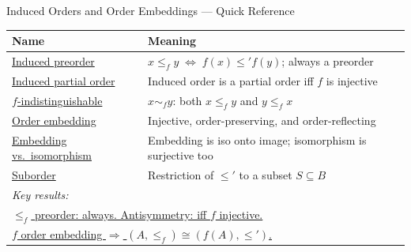 

\begin{toolkitbox}{Induced Orders and Order Embeddings --- Quick Reference}
\small
\begin{tabular}{l l}
\toprule
\textbf{Name}  & \textbf{Meaning} \\
\midrule
\hyperref[def:induced-order]{Induced preorder}     & $x \leq_f y \;\Leftrightarrow\; f(x) \leq' f(y)$; always a preorder  \\
\hyperref[prop:induced-poset]{Induced partial order}  & Induced order is a partial order iff $f$ is injective              \\
\hyperref[def:f-indist]{$f$-indistinguishable}  & $x \sim_f y$: both $x \leq_f y$ and $y \leq_f x$                   \\
\hyperref[def:order-embedding]{Order embedding}      & Injective, order-preserving, and order-reflecting                     \\
\hyperref[prop:embedding-iso]{Embedding vs.\ isomorphism}  & Embedding is iso onto image; isomorphism is surjective too \\
\hyperref[def:suborder]{Suborder}             & Restriction of $\leq'$ to a subset $S \subseteq B$                   \\
\midrule
\multicolumn{2}{l}{\textit{Key results:}} \\
\midrule
\multicolumn{2}{l}{\hyperref[prop:induced-poset]{$\leq_f$ preorder: always. \quad Antisymmetry: iff $f$ injective.}}       \\
\multicolumn{2}{l}{\hyperref[prop:embedding-iso]{$f$ order embedding $\Rightarrow$ $(A,\leq_f) \cong (f(A), \leq')$.}} \\
\bottomrule
\end{tabular}
\end{toolkitbox}


